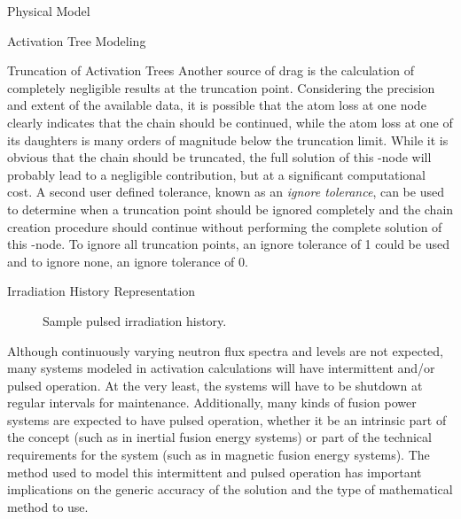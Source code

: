 \begin{chapter}{Physical Model\label{chap:physical}}
\begin{section}{Activation Tree Modeling\label{sec:physical.chains}}
\begin{subsection}{Truncation of Activation Trees\label{sec:physical.chains.trunc}}
    Another source of drag is the calculation of completely negligible
    results at the truncation point.  Considering the precision and
    extent of the available data, it is possible that the atom loss at
    one node clearly indicates that the chain should be continued,
    while the atom loss at one of its daughters is many orders of
    magnitude below the truncation limit.  While it is obvious that
    the chain should be truncated, the full solution of this \pc-node
    will probably lead to a negligible contribution, but at a
    significant computational cost.  A second user defined tolerance,
    known as an \textsl{ignore tolerance}, can be used to determine
    when a truncation point should be ignored completely and the chain
    creation procedure should continue without performing the complete
    solution of this \pc-node.  To ignore all truncation points, an
    ignore tolerance of 1 could be used and to ignore none, an ignore
    tolerance of 0.
    
  \end{subsection}
\end{section}

\begin{section}{Irradiation History Representation\label{sec:physical.pulsing}}
  
  \begin{figure}[htbp]
    \begin{center}
      \leavevmode
      \caption{Sample pulsed irradiation history.}
      \label{fig:physical.pulses}
    \end{center}
  \end{figure}
  
  Although continuously varying neutron flux spectra and levels are
  not expected, many systems modeled in activation calculations will
  have intermittent and/or pulsed operation.  At the very least, the
  systems will have to be shutdown at regular intervals for
  maintenance.  Additionally, many kinds of fusion power systems are
  expected to have pulsed operation, whether it be an intrinsic part
  of the concept (such as in inertial fusion energy systems) or part
  of the technical requirements for the system (such as in magnetic
  fusion energy systems).  The method used to model this intermittent
  and pulsed operation has important implications on the generic
  accuracy of the solution and the type of mathematical method to use.
  

\end{section}
\end{chapter}
